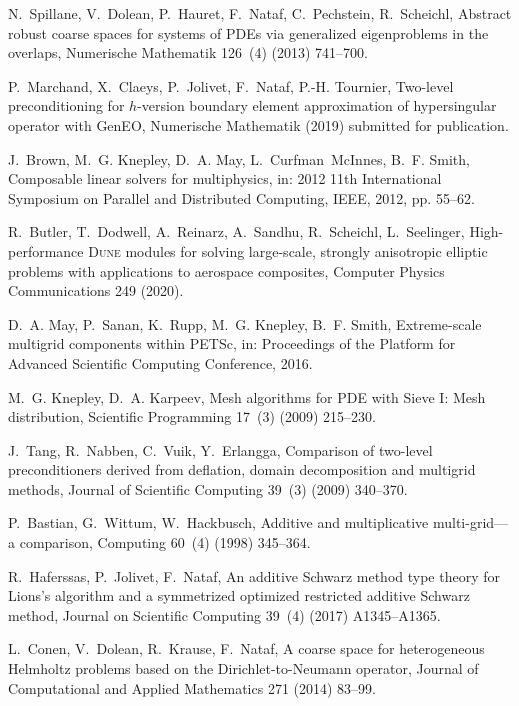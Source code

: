 \documentclass[3p,11pt]{elsarticle}
\begin{document}
\begin{thebibliography}{10}
N.~Spillane, V.~Dolean, P.~Hauret, F.~Nataf, C.~Pechstein, R.~Scheichl,
  Abstract robust coarse spaces for systems of {PDEs} via generalized
  eigenproblems in the overlaps, Numerische Mathematik 126~(4) (2013) 741--700.

P.~Marchand, X.~Claeys, P.~Jolivet, F.~Nataf, P.-H. Tournier, Two-level
  preconditioning for $h$-version boundary element approximation of
  hypersingular operator with {GenEO}, Numerische Mathematik (2019) submitted
  for publication.

J.~Brown, M.~G. Knepley, D.~A. May, L.~Curfman~McInnes, B.~F. Smith, Composable
  linear solvers for multiphysics, in: 2012 11th International Symposium on
  Parallel and Distributed Computing, IEEE, 2012, pp. 55--62.

R.~Butler, T.~Dodwell, A.~Reinarz, A.~Sandhu, R.~Scheichl, L.~Seelinger,
  High-performance \textsc{Dune} modules for solving large-scale, strongly
  anisotropic elliptic problems with applications to aerospace composites,
  Computer Physics Communications 249 (2020).

D.~A. May, P.~Sanan, K.~Rupp, M.~G. Knepley, B.~F. Smith, Extreme-scale
  multigrid components within {PETS}c, in: Proceedings of the Platform for
  Advanced Scientific Computing Conference, 2016.

M.~G. Knepley, D.~A. Karpeev, Mesh algorithms for {PDE} with {S}ieve {I}: Mesh
  distribution, Scientific Programming 17~(3) (2009) 215--230.

J.~Tang, R.~Nabben, C.~Vuik, Y.~Erlangga, Comparison of two-level
  preconditioners derived from deflation, domain decomposition and multigrid
  methods, Journal of Scientific Computing 39~(3) (2009) 340--370.

P.~Bastian, G.~Wittum, W.~Hackbusch, Additive and multiplicative multi-grid—a
  comparison, Computing 60~(4) (1998) 345--364.

R.~Haferssas, P.~Jolivet, F.~Nataf, An additive {S}chwarz method type theory
  for {L}ions's algorithm and a symmetrized optimized restricted additive
  {S}chwarz method, Journal on Scientific Computing 39~(4) (2017) A1345--A1365.

L.~Conen, V.~Dolean, R.~Krause, F.~Nataf, A coarse space for heterogeneous
  {H}elmholtz problems based on the {D}irichlet-to-{N}eumann operator, Journal
  of Computational and Applied Mathematics 271 (2014) 83--99.


\end{thebibliography}
\end{document}
